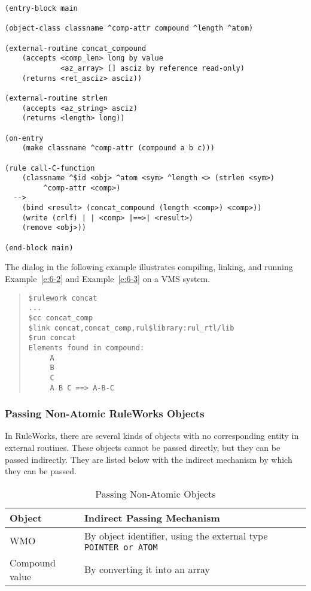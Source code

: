 \begin{exampl}
\begin{verbatim}
(entry-block main

(object-class classname ^comp-attr compound ^length ^atom)

(external-routine concat_compound
    (accepts <comp_len> long by value
             <az_array> [] asciz by reference read-only)
    (returns <ret_asciz> asciz))

(external-routine strlen
    (accepts <az_string> asciz)
    (returns <length> long))

(on-entry
    (make classname ^comp-attr (compound a b c)))

(rule call-C-function
    (classname ^$id <obj> ^atom <sym> ^length <> (strlen <sym>)
         ^comp-attr <comp>)
  -->
    (bind <result> (concat_compound (length <comp>) <comp>))
    (write (crlf) | | <comp> |==>| <result>)
    (remove <obj>))

(end-block main)
\end{verbatim}
\label{e:6-3}
\end{exampl}

The dialog in the following example illustrates compiling, linking,
and running Example~\ref{e:6-2} and Example~\ref{e:6-3} on a VMS
system.

\begin{quote}
\begin{verbatim}
$rulework concat
...
$cc concat_comp
$link concat,concat_comp,rul$library:rul_rtl/lib
$run concat
Elements found in compound:
     A
     B
     C
     A B C ==> A-B-C
\end{verbatim}
\end{quote}

\subsubsection{Passing Non-Atomic RuleWorks Objects}

In RuleWorks, there are several kinds of objects with no corresponding
entity in external routines. These objects cannot be passed directly,
but they can be passed indirectly. They are listed below with the
indirect mechanism by which they can be passed.

\begin{table}[h]
  \begin{tabularx}{\columnwidth}{lX}
    \toprule
    Object & Indirect Passing Mechanism \\
    \midrule
    WMO & By object identifier, using the external type
          \tt{POINTER} or \tt{ATOM} \\
    Compound value & By converting it into an array \\
    \bottomrule
  \end{tabularx}
  \caption{Passing Non-Atomic Objects}
  \label{t:6-2}
\end{table}

